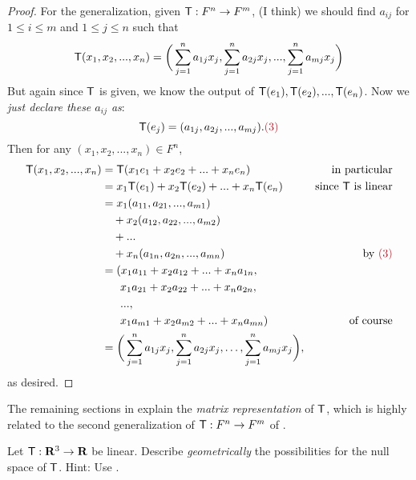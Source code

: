 \begin{proof}
For the generalization, given \(\textsf{T} : F^n \to F^m\), (I think) we should find \(a_{ij}\) for \(1 \le i \le m\) and \(1 \le j \le n\) such that
\[
    \textsf{T}(x_1, x_2, ..., x_n) = \bigg(\sum_{j = 1}^n a_{1 j} x_{j}, \sum_{j = 1}^n a_{2 j} x_{j}, ..., \sum_{j = 1}^n a_{m j} x_{j} \bigg)
\]
But again since \(\textsf{T}\) is given, we know the output of \(\textsf{T}(e_1), \textsf{T}(e_2), ..., \textsf{T}(e_n)\).
Now we \emph{just declare these \(a_{ij}\) as}:
\[
    \T(e_j) = (a_{1j}, a_{2j}, ..., a_{mj}). \MAROON{(3)}
\]
Then for any \((x_1, x_2, ..., x_n) \in F^n\),
\begin{align*}
    \T(x_1, x_2, ..., x_n) & = \T(x_1 e_1 + x_2 e_2 + ... + x_n e_n) & \text{in particular} \\
                           & = x_1 \T(e_1) + x_2 \T(e_2) + ... + x_n \T(e_n) & \text{since \(\T\) is linear} \\
                           & = x_1 (a_{11}, a_{21}, ..., a_{m1}) \\
                           & \ \ \ + x_2 (a_{12}, a_{22}, ..., a_{m2}) \\
                           & \ \ \ + ... \\
                           & \ \ \ + x_n (a_{1n}, a_{2n}, ..., a_{mn}) & \text{by \MAROON{(3)}} \\
                           & = (x_1 a_{11} + x_2 a_{12} + ... + x_n a_{1n}, \\
                           & \ \ \ \ \ x_1 a_{21} + x_2 a_{22} + ... + x_n a_{2n}, \\
                           & \ \ \ \ \ ..., \\
                           & \ \ \ \ \ x_1 a_{m1} + x_2 a_{m2} + ... + x_n a_{mn}) & \text{of course} \\
                           & = \bigg(\sum_{j=1}^n a_{1 j} x_{j}, \sum_{j=1}^n a_{2 j} x_{j}, \ldots, \sum_{j=1}^n a_{m j} x_{j} \bigg),
\end{align*}
as desired.
\end{proof}

\begin{note}
The remaining sections in  explain the \emph{matrix representation} of \(\textsf{T}\), which is highly related to the second generalization of \(\textsf{T}: F^n \to F^m\) of .
\end{note}

\begin{exercise} \label{exercise 2.1.23}
Let \(\textsf{T}: \mathbf{R}^3 \to \mathbf{R}\) be linear.
Describe \emph{geometrically} the possibilities for the null space of \(\textsf{T}\).
Hint: Use .
\end{exercise}

